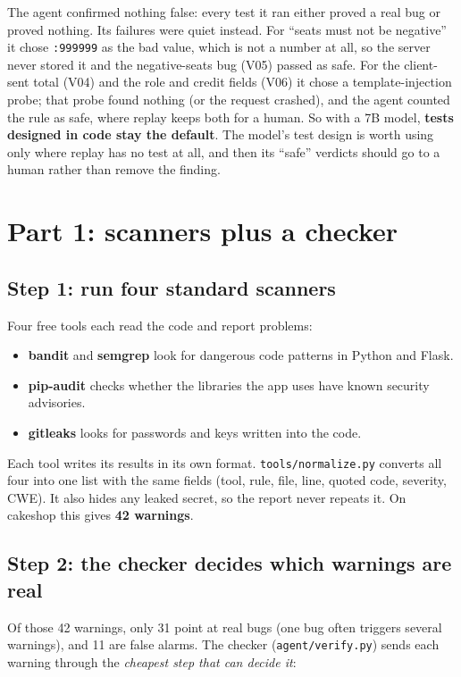 \documentclass[11pt,a4paper]{article}
\newcommand{\code}[1]{\texttt{#1}}
\begin{document}
The agent confirmed nothing false: every test it ran either proved a real bug or proved nothing. Its failures were
quiet instead. For ``seats must not be negative'' it chose \code{:999999} as the bad value, which is not a number at
all, so the server never stored it and the negative-seats bug (V05) passed as safe. For the client-sent total (V04) and the role and credit
fields (V06) it chose a template-injection probe; that probe found nothing (or the request crashed), and the
agent counted the rule as safe, where replay keeps both for a human. So with a 7B model, \textbf{tests designed in code
stay the default}. The model's test design is worth using only where replay has no test at all, and then its
``safe'' verdicts should go to a human rather than remove the finding.

\section{Part 1: scanners plus a checker}

\subsection{Step 1: run four standard scanners}
Four free tools each read the code and report problems:

\begin{itemize}
  \item \textbf{bandit} and \textbf{semgrep} look for dangerous code patterns in Python and Flask.
  \item \textbf{pip-audit} checks whether the libraries the app uses have known security advisories.
  \item \textbf{gitleaks} looks for passwords and keys written into the code.
\end{itemize}

Each tool writes its results in its own format. \code{tools/normalize.py} converts all four into one list
with the same fields (tool, rule, file, line, quoted code, severity, CWE). It also hides any leaked secret,
so the report never repeats it. On cakeshop this gives \textbf{42 warnings}.

\subsection{Step 2: the checker decides which warnings are real}
Of those 42 warnings, only 31 point at real bugs (one bug often triggers several warnings), and 11 are false
alarms. The checker (\code{agent/verify.py}) sends each warning through the \emph{cheapest step that can
decide it}:
\end{document}
